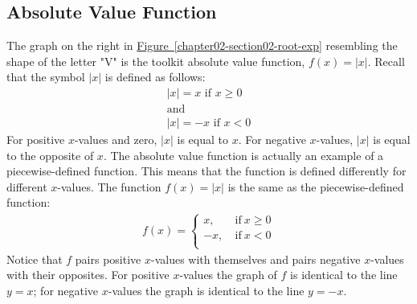 \documentclass[10pt,]{book}
\theoremstyle{ptxdefinitionnotitle}
\theoremstyle{ptxdefinitiontitle}
\numberwithin{equation}{section}
\newcommand{\lt}{<}
\newcommand{\amp}{&}
\begin{document}
\subsection[{Absolute Value Function}]{Absolute Value Function}\label{subsection-9}
\hypertarget{p-51}{}%
The graph on the right in \hyperref[chapter02-section02-root-exp]{Figure~\ref{chapter02-section02-root-exp}} resembling the shape of the letter "V" is the toolkit absolute value function, \(f(x) = \lvert x \rvert\).  Recall that the symbol \(\lvert x \rvert\) is defined as follows:%
%
\begin{gather*}
\lvert x \rvert = x \text{ if } x \geq 0\\
\text{and}\\
\lvert x \rvert = -x \text{ if } x \lt 0
\end{gather*}
\hypertarget{p-52}{}%
For positive \(x\)-values and zero, \(\lvert x \rvert\) is equal to \(x\). For negative \(x\)-values, \(\lvert x \rvert\) is equal to the opposite of \(x\).  The absolute value function is actually an example of a piecewise-defined function.  This means that the function is defined differently for different \(x\)-values.  The function \(f(x) = \lvert x \rvert\) is the same as the piecewise-defined function:%
%
\begin{align*}
f(x) =
\begin{cases}
x, \amp  \ \text{if}  \ x \geq 0 \\
-x, \amp  \ \text{if}  \ x \lt 0 \\
\end{cases}
\end{align*}
\hypertarget{p-53}{}%
Notice that \(f\) pairs positive \(x\)-values with themselves and pairs negative \(x\)-values with their opposites. For positive \(x\)-values the graph of \(f\) is identical to the line \(y = x\); for negative \(x\)-values the graph is identical to the line \(y = -x\).%
\end{document}
